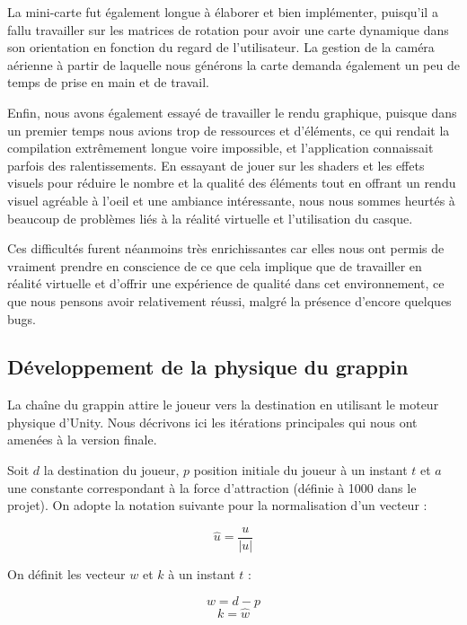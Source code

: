 \documentclass[a4paper]{elsarticle}
\begin{document}
La mini-carte fut également  longue à élaborer et bien implémenter, puisqu’il a fallu travailler sur les matrices de rotation pour avoir une carte dynamique dans son orientation en fonction du regard de l’utilisateur. La gestion de la caméra aérienne à partir de laquelle nous générons la carte demanda également un peu de temps de prise en main et de travail.

Enfin, nous avons également essayé de travailler le rendu graphique, puisque dans un premier temps nous avions trop de ressources et d’éléments, ce qui rendait la compilation extrêmement longue voire impossible, et l’application connaissait parfois des ralentissements. En essayant de jouer sur les shaders et les effets visuels pour réduire le nombre et la qualité des éléments tout en offrant un rendu visuel agréable à l’oeil et une ambiance intéressante, nous nous sommes heurtés à beaucoup de problèmes liés à la réalité virtuelle et l’utilisation du casque.

Ces difficultés furent néanmoins très enrichissantes car elles nous ont permis de vraiment prendre en conscience de ce que cela implique que de travailler en réalité virtuelle et d’offrir une expérience de qualité dans cet environnement, ce que nous pensons avoir relativement réussi, malgré la présence d’encore quelques bugs.

\subsection{Développement de la physique du grappin}

La chaîne du grappin attire le joueur vers la destination en utilisant le moteur physique d'Unity. Nous décrivons ici les itérations principales qui nous ont amenées à la version finale.

Soit $d$ la destination du joueur, $p$ position initiale du joueur à un instant $t$ et $a$ une constante correspondant à la force d'attraction (définie à 1000 dans le projet).
On adopte la notation suivante pour la normalisation d’un vecteur :

\begin{equation}
\hat{u} = \frac{u}{|u|}
\end{equation}

On définit les vecteur $w$ et $k$ à un instant $t$ :

\begin{equation}
w = d - p
\end{equation}
\begin{equation}
k = \hat{w}
\end{equation}
\end{document}
